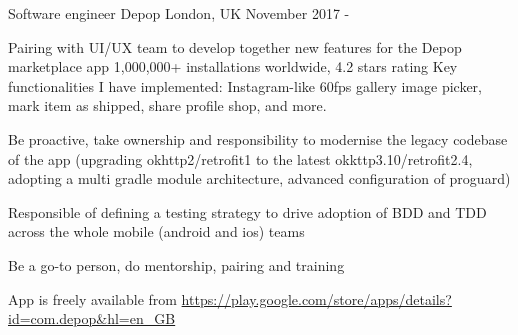 \begin{cventries}
\cventry
	{Software engineer}
{Depop}
	{London, UK}
	{November 2017 - \present{}}
{%
\begin{cvitems} 
\item 
	Pairing with UI/UX team to develop together new features for the Depop marketplace app
	1,000,000+ installations worldwide, 4.2 stars rating 
	 Key functionalities I have implemented: Instagram-like 60fps gallery image picker, mark item as shipped, share profile shop, and more. 
 \item Be proactive, take ownership and responsibility to modernise the legacy codebase of the app (upgrading okhttp2/retrofit1 to the latest okkttp3.10/retrofit2.4, adopting a multi gradle module architecture, advanced configuration of proguard) 
 \item Responsible of defining a testing strategy to drive adoption of BDD and TDD across the whole mobile (android and ios) teams
    \item Be a go-to person, do mentorship, pairing and training 
\item App is freely available from 
	\url{https://play.google.com/store/apps/details?id=com.depop&hl=en_GB} 
	\end{cvitems}
}


\end{cventries}
